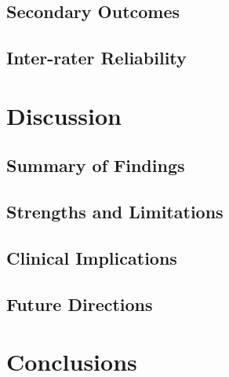 \documentclass[9pt,a4paper,twocolumn,twoside]{rho-class/rho}
\begin{document}
	\subsection{Secondary Outcomes}

	\subsection{Inter-rater Reliability}


	\section{Discussion}

	\subsection{Summary of Findings}

	\subsection{Strengths and Limitations}

	\subsection{Clinical Implications}

	\subsection{Future Directions}


	\section{Conclusions}

	
\end{document}
